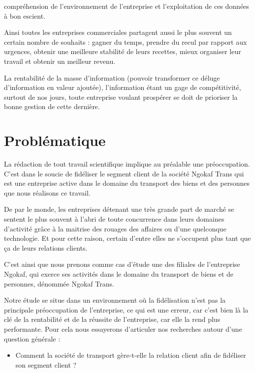     compréhension de l’environnement de l’entreprise et l’exploitation de ces données à bon
    escient.
    \par
    Ainsi toutes les entreprises commerciales partagent aussi
    le plus souvent un certain nombre de souhaits : gagner
    du temps, prendre du recul par rapport aux urgences, obtenir une meilleure
    stabilité de leurs recettes, mieux organiser leur travail et obtenir un meilleur
    revenu. \cite*{Barouch2010}
    \par
    La rentabilité de la masse d’information (pouvoir transformer ce déluge
    d’information en valeur ajoutée), l’information étant un gage de compétitivité, surtout
    de nos jours, toute entreprise voulant prospérer se doit de prioriser la bonne gestion de
    cette dernière.
    \section[Problématique]{Problématique}
    La rédaction de tout travail scientifique implique au préalable une préoccupation.
    C’est dans le soucie de fidéliser le segment client de la société Ngokaf Trans qui est une
    entreprise active dans le domaine du transport des biens et des personnes que nous
    réalisons ce travail.
    \par
    De par le monde, les entreprises détenant une très grande part de marché
    se sentent le plus souvent à l’abri de toute concurrence
    dans leurs domaines d’activité grâce à la maitrise des rouages des affaires
    ou d’une quelconque technologie. \cite*{Rouviere2010} Et pour cette raison,
    certain d’entre elles ne s’occupent plus tant que ça de leurs relations clients.
    \par
    C’est ainsi que nous prenons comme cas d’étude une des filiales de l’entreprise Ngokaf,
    qui exerce ses activités dans le domaine du transport de biens et de personnes, dénommée
    Ngokaf Trans.
    \par
    Notre étude se situe dans un environnement où la fidélisation n’est pas la principale
    préoccupation de l’entreprise, ce qui est une erreur, car c’est bien là la clé
    de la rentabilité et de la réussite de l’entreprise, car elle la rend plus performante.
    Pour cela nous essayerons d’articuler nos recherches autour d’une question générale :
    \par
        \begin{itemize}
            \item [\ding{226}] Comment la société de transport gère-t-elle la relation client afin de
            fidéliser son segment client ?
        \end{itemize}
